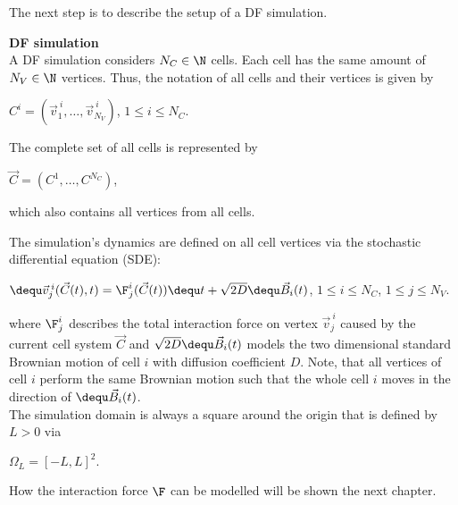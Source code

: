 The next step is to describe the setup of a DF simulation. 
\begin{definition} \textbf{DF simulation} \label{def:DF-Sim}  \\
	A DF simulation considers $N_C \in \N$ cells. 
	Each cell has the same amount of $N_V \in \N$ vertices.
	Thus, the notation of all cells and their vertices is given by 
	\begin{center}
		$C^{i} = (\vec{v}^{\:i}_1, \ldots, \vec{v}^{\:i}_{N_V})$, \hspace{0.5em} $1 \leq i \leq N_{C}$. 
	\end{center}

	The complete set of all cells is represented by 
	\begin{center}
		$\vec{C} = (C^{1}, \ldots, C^{N_C})$,
	\end{center}
	which also contains all vertices from all cells.

	The simulation's dynamics are defined on all cell vertices via the stochastic differential equation (SDE):
	\begin{center}
		$ \dequ \vec{v}^{\:i}_j(\vec{C}(t), t) = \F^i_j(\vec{C}(t)) \dequ t + \sqrt{2 D} \dequ \vec{B}_i(t)$, \hspace{0.5em} $1 \leq i \leq N_{C}$, \hspace{0.5em} $1 \leq j \leq N_{V}$. 
	\end{center}
	where $\F^i_j$ describes the total interaction force on vertex $\vec{v}^{\:i}_j$ caused by the current cell system $\vec{C}$ and $\sqrt{2 D} \dequ \vec{B}_i(t)$ models the two dimensional standard Brownian motion of cell $i$ with diffusion coefficient $D$.  
	Note, that all vertices of cell $i$ perform the same Brownian motion such that the whole cell $i$ moves in the direction of $\dequ \vec{B}_i(t)$. \\

	The simulation domain is always a square around the origin that is defined by $L > 0$ via 
	\begin{center}
		$
		\Omega_L = [-L, L]^2.
		$
	\end{center} 
\end{definition}

How the interaction force $\F$ can be modelled will be shown the next chapter. 




